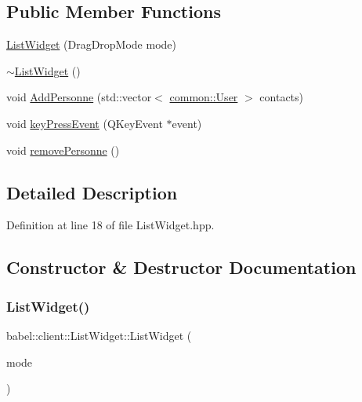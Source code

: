 \subsection*{Public Member Functions}
\begin{DoxyCompactItemize}
\item 
\mbox{\hyperlink{classbabel_1_1client_1_1_list_widget_a6ecf9866bfc44899550cb68058b5ea4a}{List\+Widget}} (Drag\+Drop\+Mode mode)
\item 
\mbox{\hyperlink{classbabel_1_1client_1_1_list_widget_ab68cd5daa67dd1a64289f2ff14c7e69c}{$\sim$\+List\+Widget}} ()
\item 
void \mbox{\hyperlink{classbabel_1_1client_1_1_list_widget_a09efb876b98429ec35f03ddae598f18e}{Add\+Personne}} (std\+::vector$<$ \mbox{\hyperlink{classbabel_1_1common_1_1_user}{common\+::\+User}} $>$ contacts)
\item 
void \mbox{\hyperlink{classbabel_1_1client_1_1_list_widget_a65feab6e2e0faaf50bd6cbb894d253b8}{key\+Press\+Event}} (Q\+Key\+Event $\ast$event)
\item 
void \mbox{\hyperlink{classbabel_1_1client_1_1_list_widget_a69c381e8e2c881b9d8478d978f27ee55}{remove\+Personne}} ()
\end{DoxyCompactItemize}


\subsection{Detailed Description}


Definition at line 18 of file List\+Widget.\+hpp.



\subsection{Constructor \& Destructor Documentation}
\mbox{\label{classbabel_1_1client_1_1_list_widget_a6ecf9866bfc44899550cb68058b5ea4a}} 
\subsubsection{\texorpdfstring{List\+Widget()}{ListWidget()}}
{\footnotesize\ttfamily babel\+::client\+::\+List\+Widget\+::\+List\+Widget (\begin{DoxyParamCaption}\item[{Drag\+Drop\+Mode}]{mode }\end{DoxyParamCaption})}




